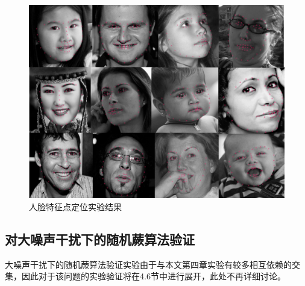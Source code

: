 \begin{figure}[htb]
	\centering 
	\includegraphics[width=\textwidth]{./mypic/人脸特征点定位实验.jpg} 
	\caption{人脸特征点定位实验结果} 
\end{figure}



\subsection{对大噪声干扰下的随机蕨算法验证} %

大噪声干扰下的随机蕨算法验证实验由于与本文第四章实验有较多相互依赖的交集，因此对于该问题的实验验证将在4.6节中进行展开，此处不再详细讨论。


























